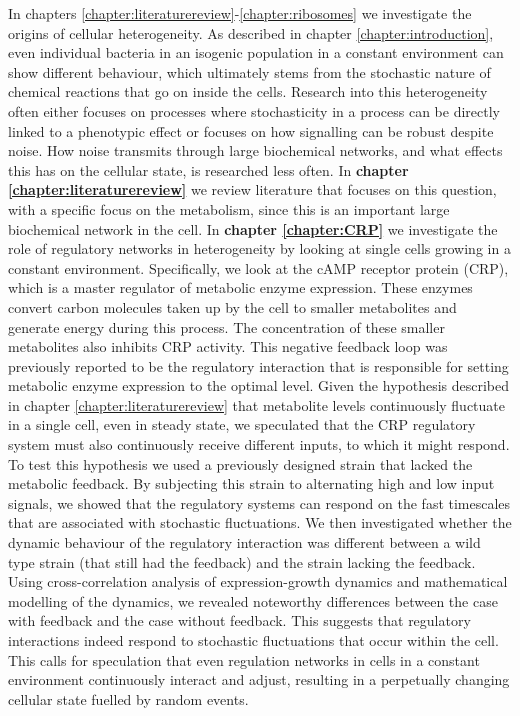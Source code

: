 In chapters \ref{chapter:literaturereview}-\ref{chapter:ribosomes} we investigate the origins of cellular heterogeneity.
%
As described in chapter \ref{chapter:introduction}, 
even individual bacteria in an isogenic population in a constant environment can show different behaviour,
which ultimately stems from the stochastic nature of 
chemical reactions that go on inside the cells.
%
Research into this heterogeneity often either focuses on processes where stochasticity in a process can be directly linked to a phenotypic effect
or focuses on how signalling can be robust despite noise.
%
How noise transmits through large biochemical networks, and what effects this has on the cellular state, is researched less often.
%
In
\textbf{chapter \ref{chapter:literaturereview}} we review literature that focuses on this question,
with a specific focus on the metabolism, 
since this 
is an important large biochemical network in the cell.
%
In \textbf{chapter \ref{chapter:CRP}} we investigate the role of regulatory networks in heterogeneity by looking at single cells growing in a constant environment. 
%
Specifically, we look at the 
cAMP receptor protein (CRP), 
which is a master regulator of metabolic enzyme expression.
%
These enzymes convert carbon molecules taken up by the cell to smaller metabolites and generate energy during this process.
%
The concentration of these smaller metabolites also inhibits CRP activity.
This negative feedback loop was previously reported to be the regulatory interaction that is responsible for 
setting metabolic enzyme expression to the optimal level.
%
Given the hypothesis described in chapter \ref{chapter:literaturereview} that metabolite levels continuously fluctuate in a single cell, even in steady state, 
we speculated that the CRP regulatory system must also continuously receive different inputs, to which it might respond.
%
To test this hypothesis we used a previously designed strain that lacked the metabolic feedback.
By subjecting this strain to alternating high and low input signals, 
we showed that the regulatory systems can respond on the fast timescales that are associated with stochastic fluctuations.
%
We then investigated whether the dynamic behaviour of the regulatory interaction was different 
between a wild type strain (that still had the feedback) and the strain lacking the feedback.
%
Using cross-correlation analysis of expression-growth dynamics and mathematical modelling of the dynamics,
we revealed noteworthy differences between the case with feedback and the case without feedback.
%
This suggests that regulatory interactions indeed respond to stochastic fluctuations that occur within the cell.
%
This calls for speculation that even regulation networks in cells in a constant environment 
continuously interact and adjust, 
resulting in a perpetually changing cellular state fuelled by random events.





